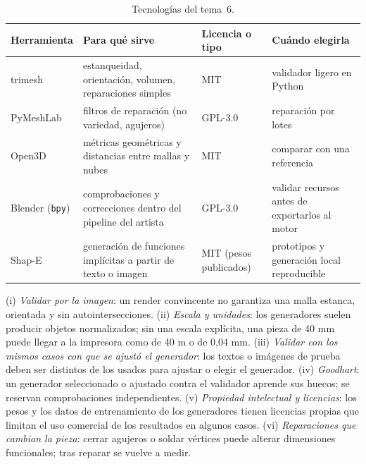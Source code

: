 \begin{table}[h]
\centering\small
\begin{tabularx}{\textwidth}{@{}l>{\raggedright\arraybackslash}X>{\raggedright\arraybackslash}p{2.6cm}>{\raggedright\arraybackslash}X@{}}
\toprule
Herramienta & Para qué sirve & Licencia o tipo & Cuándo elegirla \\
\midrule
trimesh & estanqueidad, orientación, volumen, reparaciones simples & MIT & validador ligero en Python \\
PyMeshLab & filtros de reparación (no variedad, agujeros) & GPL-3.0 & reparación por lotes \\
Open3D & métricas geométricas y distancias entre mallas y nubes & MIT & comparar con una referencia \\
Blender (\texttt{bpy}) & comprobaciones y correcciones dentro del pipeline del artista & GPL-3.0 & validar recursos antes de exportarlos al motor \\
Shap-E & generación de funciones implícitas a partir de texto o imagen & MIT (pesos publicados) & prototipos y generación local reproducible \\
\bottomrule
\end{tabularx}
\caption{Tecnologías del tema~6.}
\label{tab:tec6}
\end{table}

\begin{observacion}\label{obs:errores6}
(i) \emph{Validar por la imagen}: un render convincente no garantiza una malla estanca, orientada y sin autointersecciones. (ii) \emph{Escala y unidades}: los generadores suelen producir objetos normalizados; sin una escala explícita, una pieza de 40 mm puede llegar a la impresora como de 40 m o de 0,04 mm. (iii) \emph{Validar con los mismos casos con que se ajustó el generador}: los textos o imágenes de prueba deben ser distintos de los usados para ajustar o elegir el generador. (iv) \emph{Goodhart}: un generador seleccionado o ajustado contra el validador aprende sus huecos; se reservan comprobaciones independientes. (v) \emph{Propiedad intelectual y licencias}: los pesos y los datos de entrenamiento de los generadores tienen licencias propias que limitan el uso comercial de los resultados en algunos casos. (vi) \emph{Reparaciones que cambian la pieza}: cerrar agujeros o soldar vértices puede alterar dimensiones funcionales; tras reparar se vuelve a medir.
\end{observacion}

